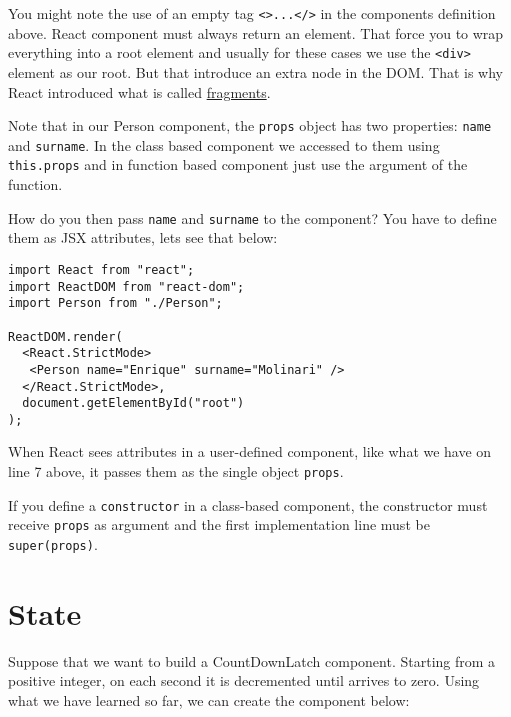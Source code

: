 \documentclass[a4paper, oneside, titlepage, 12pt]{book}
\begin{document}
\begin{displayquote}
{\small You might note the use of an empty tag \texttt{<>...</>} in the components definition above. React component must always return an element. That force you to wrap everything into a root element and usually for these cases we use the \texttt{<div>} element as our root. But that introduce an extra node in the DOM. That is why React introduced what is called \href{https://reactjs.org/docs/fragments.html}{fragments}.}
\end{displayquote}

Note that in our Person component, the \texttt{props} object has two properties: \texttt{name} and \texttt{surname}. In the class based component we accessed to them using \texttt{this.props} and in function based component just use the argument of the function.
\newline

How do you then pass \texttt{name} and \texttt{surname} to the component? You have to define them as JSX attributes, lets see that below:

\begin{verbatim}
import React from "react";
import ReactDOM from "react-dom";
import Person from "./Person";

ReactDOM.render(
  <React.StrictMode>
   <Person name="Enrique" surname="Molinari" />
  </React.StrictMode>,
  document.getElementById("root")
);
\end{verbatim}

When React sees attributes in a user-defined component, like what we have on line 7 above, it passes them as the single object \texttt{props}.

\begin{displayquote}
{\small If you define a \texttt{constructor} in a class-based component, the constructor must receive \texttt{props} as argument and the first implementation line must be \texttt{super(props)}}.
\end{displayquote}



\section{State} \label{state_section}
Suppose that we want to build a CountDownLatch component. Starting from a positive integer, on each second it is decremented until arrives to zero. Using what we have learned so far, we can create the component below:
\end{document}
